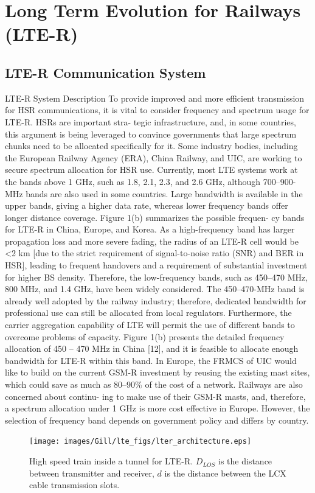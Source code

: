 \chapter{Long Term Evolution for Railways (LTE-R)}
\label{chapter4}

\section{LTE-R Communication System}
LTE-R System Description To provide improved and more efficient transmission for
HSR communications, it is vital to consider frequency and spectrum usage for LTE-R. HSRs are important stra-
tegic infrastructure, and, in some countries, this argument is being leveraged to convince governments that
large spectrum chunks need to be allocated specifically for it. Some industry bodies, including the European
Railway Agency (ERA), China Railway, and UIC, are working to secure spectrum allocation for HSR use. Currently,
most LTE systems work at the bands above 1 GHz, such as 1.8, 2.1, 2.3, and 2.6 GHz, although 700–900-MHz
bands are also used in some countries. Large bandwidth is available in the upper bands, giving a higher data rate,
whereas lower frequency bands offer longer distance coverage. Figure 1(b) summarizes the possible frequen-
cy bands for LTE-R in China, Europe, and Korea. As a high-frequency band has larger propagation loss and
more severe fading, the radius of an LTE-R cell would be <2 km [due to the strict requirement of signal-to-noise ratio (SNR) 
and BER in HSR], leading to frequent handovers and a requirement of substantial investment for higher BS density. Therefore, the low-frequency bands,
such as 450–470 MHz, 800 MHz, and 1.4 GHz, have been widely considered. The 450–470-MHz band is already
well adopted by the railway industry; therefore, dedicated bandwidth for professional use can still be allocated
from local regulators. Furthermore, the carrier aggregation capability of LTE will permit the use of different bands to overcome problems of capacity. Figure 1(b)
presents the detailed frequency allocation of 450 – 470  MHz in China [12], and it is feasible to allocate
enough bandwidth for LTE-R within this band. In Europe, the FRMCS of UIC would like to build on the current GSM-R investment by reusing the existing mast
sites, which could save as much as 80–90\% of the cost of a network. Railways are also concerned about continu-
ing to make use of their GSM-R masts, and, therefore, a spectrum allocation under 1 GHz is more cost effective
in Europe. However, the selection of frequency band depends on government policy and differs by country.
\begin{figure}[t]
\label{fig:ltearch}
\centering
\texttt{[image: images/Gill/lte\_figs/lter\_architecture.eps]} 
\caption{High speed train inside a tunnel for LTE-R. $D_{LOS}$ is the distance between transmitter and receiver, $d$ is the distance between the LCX cable transmission slots.}
\end{figure}


